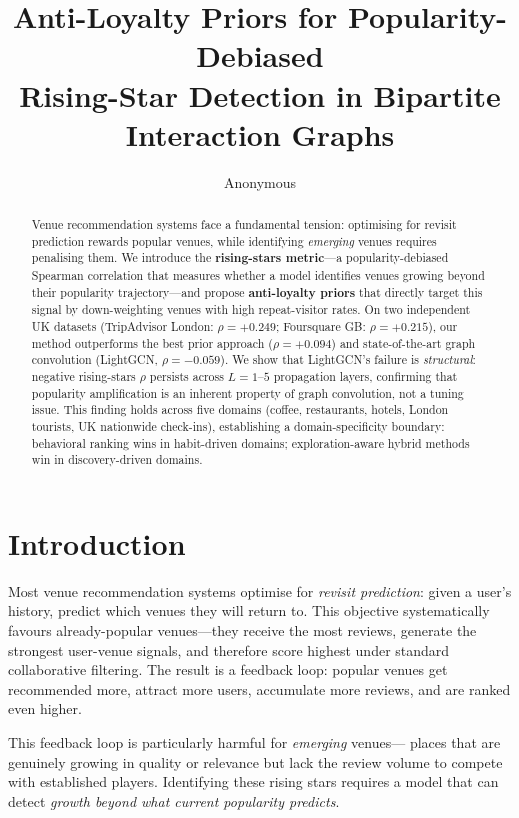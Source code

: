 \documentclass{article}
\title{Anti-Loyalty Priors for Popularity-Debiased\\
       Rising-Star Detection in Bipartite Interaction Graphs}
\author{Anonymous}
\date{}
\begin{document}
\maketitle

\begin{abstract}
Venue recommendation systems face a fundamental tension: optimising for revisit
prediction rewards popular venues, while identifying \emph{emerging} venues
requires penalising them. We introduce the \textbf{rising-stars metric}---a
popularity-debiased Spearman correlation that measures whether a model
identifies venues growing beyond their popularity trajectory---and propose
\textbf{anti-loyalty priors} that directly target this signal by down-weighting
venues with high repeat-visitor rates. On two independent UK datasets
(TripAdvisor London: $\rho{=}+0.249$; Foursquare GB: $\rho{=}+0.215$), our
method outperforms the best prior approach ($\rho{=}+0.094$) and
state-of-the-art graph convolution (LightGCN, $\rho{=}-0.059$).
We show that LightGCN's failure is \emph{structural}: negative
rising-stars $\rho$ persists across $L{=}1$--$5$ propagation layers,
confirming that popularity amplification is an inherent property of
graph convolution, not a tuning issue.
This finding holds across five domains (coffee, restaurants, hotels, London
tourists, UK nationwide check-ins), establishing a domain-specificity boundary:
behavioral ranking wins in habit-driven domains; exploration-aware hybrid
methods win in discovery-driven domains.
\end{abstract}

\section{Introduction}

Most venue recommendation systems optimise for \emph{revisit prediction}:
given a user's history, predict which venues they will return to.
This objective systematically favours already-popular venues---they receive
the most reviews, generate the strongest user-venue signals, and therefore
score highest under standard collaborative filtering.
The result is a feedback loop: popular venues get recommended more,
attract more users, accumulate more reviews, and are ranked even higher.

This feedback loop is particularly harmful for \emph{emerging} venues---
places that are genuinely growing in quality or relevance but lack the
review volume to compete with established players.
Identifying these rising stars requires a model that can detect
\emph{growth beyond what current popularity predicts}.
\end{document}

